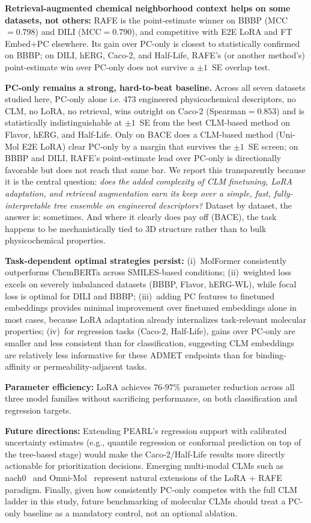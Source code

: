 \documentclass[final,1p,times]{elsarticle}
\begin{document}
\textbf{Retrieval-augmented chemical neighborhood context helps on some datasets, not others:}
RAFE is the point-estimate winner on BBBP (MCC$=0.798$) and DILI (MCC$=0.790$), and competitive with E2E LoRA and FT Embed+PC elsewhere. Its gain over PC-only is closest to statistically confirmed on BBBP; on DILI, hERG, Caco-2, and Half-Life, RAFE's (or another method's) point-estimate win over PC-only does not survive a $\pm1$~SE overlap test.

\textbf{PC-only remains a strong, hard-to-beat baseline.} Across all seven datasets studied here, PC-only alone i.e. 473 engineered physicochemical descriptors, no CLM, no LoRA, no retrieval, wins outright on Caco-2 (Spearman$=0.853$) and is statistically indistinguishable at $\pm1$~SE from the best CLM-based method on Flavor, hERG, and Half-Life. Only on BACE does a CLM-based method (Uni-Mol E2E LoRA) clear PC-only by a margin that survives the $\pm1$~SE screen; on BBBP and DILI, RAFE's point-estimate lead over PC-only is directionally favorable but does not reach that same bar. We report this transparently because it is the central question: \emph{does the added complexity of CLM finetuning, LoRA adaptation, and retrieval augmentation earn its keep over a simple, fast, fully-interpretable tree ensemble on engineered descriptors?} Dataset by dataset, the answer is: sometimes. And where it clearly does pay off (BACE), the task happens to be mechanistically tied to 3D structure rather than to bulk physicochemical properties.

\textbf{Task-dependent optimal strategies persist:} (i)~MolFormer consistently outperforms ChemBERTa across SMILES-based conditions; (ii)~weighted loss excels on severely imbalanced datasets (BBBP, Flavor, hERG-WL), while focal loss is optimal for DILI and BBBP; (iii)~adding PC features to finetuned embeddings provides minimal improvement over finetuned embeddings alone in most cases, because LoRA adaptation already internalizes task-relevant molecular properties; (iv)~for regression tasks (Caco-2, Half-Life), gains over PC-only are smaller and less consistent than for classification, suggesting CLM embeddings are relatively less informative for these ADMET endpoints than for binding-affinity or permeability-adjacent tasks.

\textbf{Parameter efficiency:} LoRA achieves $76$-$97\%$ parameter reduction across all three model families without sacrificing performance, on both classification and regression targets.

\textbf{Future directions:} Extending PEARL's regression support with calibrated uncertainty estimates (e.g., quantile regression or conformal prediction on top of the tree-based stage) would make the Caco-2/Half-Life results more directly actionable for prioritization decisions. Emerging multi-modal CLMs such as nach0~\cite{livne2024nach0} and Omni-Mol~\cite{hu2025omnimol} represent natural extensions of the LoRA + RAFE paradigm. Finally, given how consistently PC-only competes with the full CLM ladder in this study, future benchmarking of molecular CLMs should treat a PC-only baseline as a mandatory control, not an optional ablation.
\end{document}
